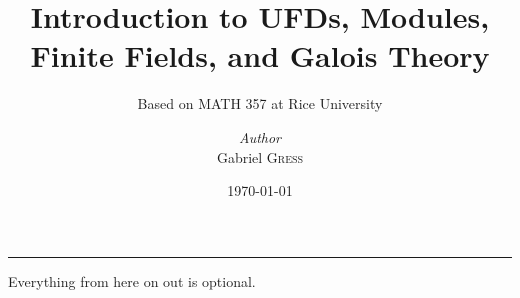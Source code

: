 \documentclass{memoir}
\institute{Rice University}
\title{Introduction to UFDs, Modules, Finite Fields, and Galois Theory}
\subtitle{Based on MATH 357 at Rice University}
\author{\textit{Author}\\ Gabriel \textsc{Gress}}
\date{\today}
\begin{document}
\maketitle

\tableofcontents

\setcounter{chapter}{-1}
































\par\noindent\rule[5pt]{\textwidth}{0.4pt}
Everything from here on out is optional.


\end{document}
